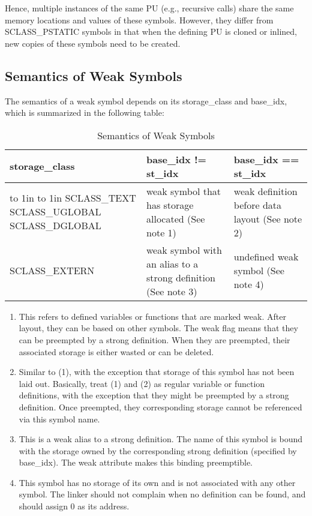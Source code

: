 Hence, multiple instances of the same
%
PU (e.g., recursive calls) share
the same memory locations and values of these symbols. However, they
differ from
%
SCLASS\_PSTATIC symbols in that when the defining
%
PU
is cloned or inlined, new copies of these symbols need to be created.

\subsection{Semantics of Weak Symbols}

The semantics of a weak symbol depends on its storage\_class and
base\_idx, which is summarized in the following table:

\begin{table}[h]
\centering
\caption{Semantics of Weak Symbols}
\label{table10} 
\begin{tabular}{|l|p{2in}|p{2in}|}\hline
storage\_class & base\_idx != st\_idx & base\_idx == st\_idx\\\hline\hline
\vbox to 1in{
\vbox to 1in{
\vfil
\hbox{SCLASS\_TEXT}
\vfil
\hbox{SCLASS\_UGLOBAL}
\vfil
\hbox{SCLASS\_DGLOBAL}
\vfil
}
}
&
weak symbol that has storage allocated (See note 1)  &
weak definition before data layout (See note 2) \\\hline

\index{SCLASS\_EXTERN}%
SCLASS\_EXTERN & weak symbol with an alias to a strong definition (See
note 3) &  undefined weak symbol (See note 4) \\\hline
\end{tabular}
\end{table}

\begin{enumerate}
\item This refers to defined variables or functions that are marked
weak. After layout, they can be based on other symbols. The weak flag
means that they can be preempted by a strong definition. When they are
preempted, their associated storage is either wasted or can be deleted.

\item Similar to (1), with the exception that storage of this symbol
has not been laid out. Basically, treat (1) and (2) as regular variable
or function definitions, with the exception that they might be
preempted by a strong definition. Once preempted, they corresponding
storage cannot be referenced via this symbol name.

\item This is a weak alias to a strong definition. The name of this
symbol is bound with the storage owned by the corresponding strong
definition (specified by base\_idx). The weak attribute makes this
binding preemptible.

\item This symbol has no storage of its own and is not associated with
any other symbol. The linker should not complain when no definition can
be found, and should assign 0 as its address.
\end{enumerate}


